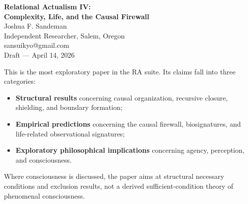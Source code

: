 \documentclass[11pt]{article}
\begin{document}
\begin{center}
{\LARGE \textbf{Relational Actualism IV:\\[0.3em] Complexity, Life, and the Causal Firewall}}\\[1em]
{\large Joshua F. Sandeman}\\[0.25em]
{\normalsize Independent Researcher, Salem, Oregon}\\[0.15em]
{\small sansuikyo@gmail.com}\\[0.5em]
{\normalsize Draft --- April 14, 2026}
\end{center}

\begin{abstract}
This paper extends Relational Actualism (RA) into the domains of complexity, life, agency, and cognition. Its central aim is not to claim complete derivation of these domains, but to develop a common discrete framework in which they can be discussed using the same ontology as the rest of the RA suite: finite actual graphs, structured potentia, shielding, recursive closure, and the causal firewall. The paper contains three distinct kinds of claims, which are explicitly distinguished throughout: structural results concerning causal organization and boundary formation; empirical or observational predictions concerning life, biosignatures, and the causal firewall; and exploratory philosophical implications concerning agency, perception, and consciousness. The strongest contributions of the paper concern recursive closure, shielding, and the organizational conditions under which stable complexity can persist. Where consciousness is discussed, the paper aims at structural necessary conditions and exclusion results, not a derived sufficient-condition theory of phenomenal consciousness. The paper should therefore be read as the most exploratory member of the RA suite: a disciplined extension of the framework into complexity and life, rather than a claim of full closure on these topics.
\end{abstract}

\begin{tcolorbox}[title=Epistemic Status of This Paper,colback=gray!5,colframe=gray!60]
This is the most exploratory paper in the RA suite. Its claims fall into three categories:
\begin{itemize}[nosep]
    \item \textbf{Structural results} concerning causal organization, recursive closure, shielding, and boundary formation;
    \item \textbf{Empirical predictions} concerning the causal firewall, biosignatures, and life-related observational signatures;
    \item \textbf{Exploratory philosophical implications} concerning agency, perception, and consciousness.
\end{itemize}
Where consciousness is discussed, the paper aims at structural necessary conditions and exclusion results, not a derived sufficient-condition theory of phenomenal consciousness.
\end{tcolorbox}
\end{document}
